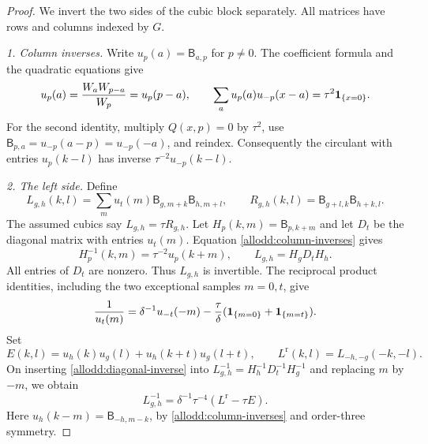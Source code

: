 \begin{proof}
We invert the two sides of the cubic block separately. All matrices
have rows and columns indexed by $G$.

\emph{1. Column inverses.} Write $u_p(a)=\mathsf B_{a,p}$ for
$p\ne0$.  The coefficient formula and the quadratic equations give
\begin{equation}\label{allodd:column-inverses}
 u_p(a)=\frac{W_aW_{p-a}}{W_p}=u_p(p-a),\qquad
 \sum_a u_p(a)u_{-p}(x-a)=\tau^2\mathbf1_{\{x=0\}}.
\end{equation}
For the second identity, multiply $Q(x,p)=0$ by $\tau^2$,
use $\mathsf B_{p,a}=u_{-p}(a-p)=u_{-p}(-a)$, and reindex.
Consequently the circulant with entries $u_p(k-l)$ has inverse
$\tau^{-2}u_{-p}(k-l)$.

\emph{2. The left side.} Define
\[
 L_{g,h}(k,l)=\sum_m u_t(m)\mathsf B_{g,m+k}
                                      \mathsf B_{h,m+l},
 \qquad
 R_{g,h}(k,l)=\mathsf B_{g+l,k}\mathsf B_{h+k,l}.
\]
The assumed cubics say $L_{g,h}=\tau R_{g,h}$.
Let $H_p(k,m)=\mathsf B_{p,k+m}$ and let $D_t$ be the
diagonal matrix with entries $u_t(m)$.  Equation
\eqref{allodd:column-inverses} gives
\[
 H_p^{-1}(k,m)=\tau^{-2}u_p(k+m),\qquad
 L_{g,h}=H_gD_tH_h.
\]
All entries of $D_t$ are nonzero.  Thus $L_{g,h}$ is invertible.
The reciprocal product identities, including the two exceptional samples $m=0,t$,
give
\begin{equation}\label{allodd:diagonal-inverse}
 \frac1{u_t(m)}=\delta^{-1}u_{-t}(-m)
       -\frac{\tau}{\delta}
                    (\mathbf1_{\{m=0\}}+\mathbf1_{\{m=t\}}).
\end{equation}
Set
\[
 E(k,l)=u_h(k)u_g(l)+u_h(k+t)u_g(l+t),
 \qquad
 L^{\mathrm r}(k,l)=L_{-h,-g}(-k,-l).
\]
On inserting \eqref{allodd:diagonal-inverse} into
$L_{g,h}^{-1}=H_h^{-1}D_t^{-1}H_g^{-1}$ and replacing
$m$ by $-m$, we obtain
\begin{equation}\label{allodd:left-inverse}
 L_{g,h}^{-1}=\delta^{-1}\tau^{-4}
                         (L^{\mathrm r}-\tau E).
\end{equation}
Here $u_h(k-m)=\mathsf B_{-h,m-k}$, by
\eqref{allodd:column-inverses} and order-three symmetry.


\end{proof}
